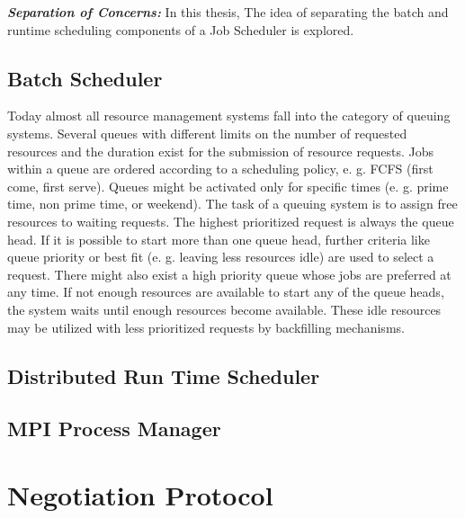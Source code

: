 \textbf{\textit{Separation of Concerns: }}In this thesis, The idea of separating the batch and runtime scheduling components of a Job Scheduler is explored. 

\subsection{Batch Scheduler}
Today almost all resource management systems fall into the category of queuing systems. Several queues with different limits on the number of requested resources and the duration exist for the submission of resource requests. Jobs within a queue are ordered according to a scheduling policy, e. g. FCFS (first come, first serve). Queues might be activated only for specific times (e. g. prime time, non prime time, or weekend). The task of a queuing system is to assign free resources to waiting requests. The highest prioritized request is always the queue head. If it is possible to start more than one queue head, further criteria like queue priority or best fit (e. g. leaving less resources idle) are used to select a request. There might also exist a high priority queue whose jobs are preferred at any time. If not enough resources are available to start any of the queue heads, the system waits until enough resources become available. These idle resources may be utilized with less prioritized requests by backfilling mechanisms.
\subsection{Distributed Run Time Scheduler}
\subsection{MPI Process Manager}


\section{Negotiation Protocol}
